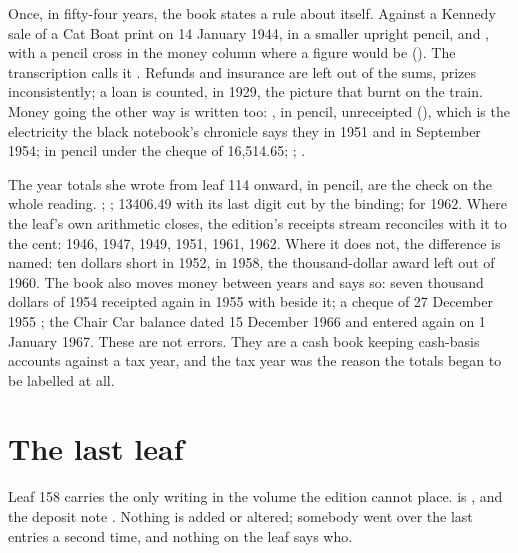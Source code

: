 Once, in fifty-four years, the book states a rule about itself. Against a Kennedy sale of a Cat Boat print on 14 January 1944, in a smaller upright pencil,  and , with a pencil cross in the money column where a figure would be (). The transcription calls it . Refunds and insurance are left out of the sums, prizes inconsistently; a loan is counted,  in 1929, the picture that burnt on the train. Money going the other way is written too: , in pencil, unreceipted (), which is the electricity the black notebook's chronicle says they  in 1951 and  in September 1954;  in pencil under the cheque of 16,514.65; ; .

The year totals she wrote from leaf 114 onward, in pencil, are the check on the whole reading. ; ;  13406.49 with its last digit cut by the binding;  for 1962. Where the leaf's own arithmetic closes, the edition's receipts stream reconciles with it to the cent: 1946, 1947, 1949, 1951, 1961, 1962. Where it does not, the difference is named: ten dollars short in 1952,  in 1958, the thousand-dollar award left out of 1960. The book also moves money between years and says so: seven thousand dollars of 1954 receipted again in 1955 with  beside it; a cheque of 27 December 1955 ; the Chair Car balance dated 15 December 1966 and entered again on 1 January 1967. These are not errors. They are a cash book keeping cash-basis accounts against a tax year, and the tax year was the reason the totals began to be labelled at all.

\section{The last leaf}

Leaf 158 carries the only writing in the volume the edition cannot place.  is , and the deposit note . Nothing is added or altered; somebody went over the last entries a second time, and nothing on the leaf says who.

